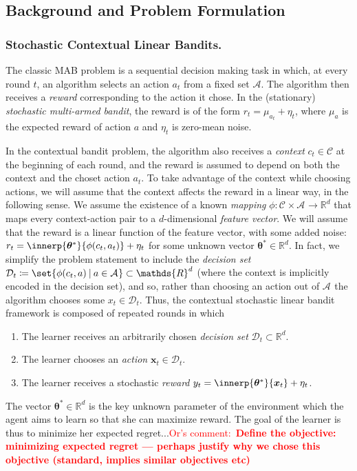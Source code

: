 \documentclass{article}
\newcommand{\os}[1]{\textcolor{red}{Or's comment:~\textbf{#1}}}
\renewcommand{\vec}[1]{\bm{#1}}
\newcommand{\defeq}{\coloneq}
\newcommand{\Real}{\mathds{R}}
\newcommand\given[1][\delimsize]{%
  \providecommand{\delimsize}{}
  \nonscript\:#1\vert\allowbreak\nonscript\:\mathopen{}
}
\newcommand{\A}{\mathcal{A}}
\newcommand{\C}{\mathcal{C}}
\newcommand{\Aset}[1]{\mathcal{A}_{#1}}
\newcommand{\Dset}[1]{\mathcal{D}_{#1}}
\newcommand{\Cset}[1]{\mathcal{C}_{#1}}
\begin{document}
\subsection{Background and Problem Formulation}
\label{subsec:intro_background}

\subsubsection{Stochastic Contextual Linear Bandits.}%
\label{sec:contextual-bandits}

The classic MAB problem is a sequential decision making task in which, at
every round $t$, an algorithm selects an action $a_t$ from a fixed set $\A$.
The algorithm then receives a \emph{reward}
corresponding to the action it chose.  In the (stationary)
\emph{stochastic multi-armed bandit}, the reward is of the form $r_t =
\mu_{a_t} + \eta_t$, where $\mu_a$ is the expected reward of action $a$
and $\eta_t$ is zero-mean noise.

In the contextual bandit problem, the algorithm also receives a
\emph{context} $c_t\in\C$ at the beginning of each round, and the
reward is assumed to depend on both the context and the choset action $a_t$.  To
take advantage of the context while choosing actions, we will assume
that the context affects the reward in a linear way, in the following
sense.  We assume the existence of a known \emph{mapping}
$\phi:\Cset{}\times\Aset{}\to\Real^d$ that maps every context-action
pair to a $d$-dimensional \emph{feature vector}.  We will assume that
the reward is a linear function of the feature vector, with some added
noise: $r_t = \innerp{\vec\theta^*}{\phi(c_t,a_t)} + \eta_t$ for some
unknown vector $\vec\theta^*\in\Real^d$. In fact, we simplify the
problem statement to include the \emph{decision set}
$\Dset{t} \defeq \set{\phi(c_t,a)\given a\in\Aset{}} \subset \Real^d$
(where the context is implicitly encoded in the decision set), and so,
rather than choosing an action out of $\Aset{}$ the algorithm chooses
some $x_t\in\Dset{t}$.  Thus, the contextual stochastic linear bandit
framework is composed of repeated rounds in which
\begin{enumerate}
\item The learner receives an arbitrarily chosen \emph{decision set} $\mathcal{D}_t \subset
  \Real^d$.
\item The learner chooses an \emph{action} $\vec x_t \in \mathcal{D}_t$.
\item The learner receives a stochastic \emph{reward}
  $y_t = \innerp{\vec\theta^*}{\vec x_t} + \eta_t$.
\end{enumerate}
The vector $\vec\theta^*\in\Real^d$ is the key unknown parameter of the
environment which the agent aims to learn so that she can maximize reward. The goal of the learner is thus to minimize her expected regret...\os{Define the objective: minimizing expected regret --- perhaps justify why we chose this objective (standard, implies similar objectives etc)}
\end{document}
